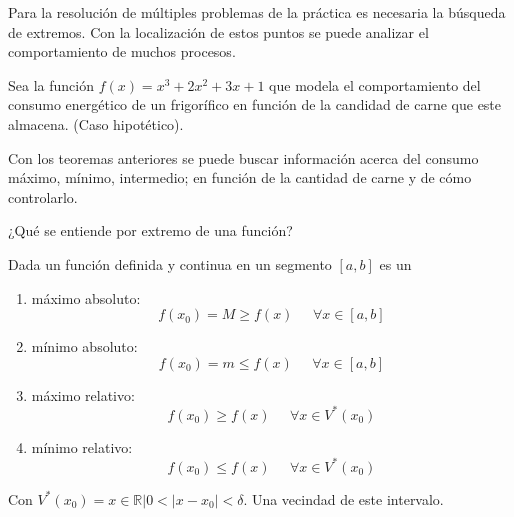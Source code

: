 \documentclass[10pt,twoside]{SelfArx} %
\begin{document}
   
   Para la resolución de múltiples problemas de la práctica es necesaria la búsqueda de extremos. Con la localización de estos puntos se puede analizar el comportamiento de muchos procesos.\\
\begin{ejemplo}
	Sea la función $ f(x)=x^{3}+2x^{2}+3x+1 $ que modela el comportamiento del consumo energético  de un frigorífico en función de la candidad de carne que este almacena. (Caso hipotético).
\end{ejemplo}	
   Con los teoremas anteriores se puede buscar información acerca del consumo máximo, mínimo, intermedio; en función de la cantidad de carne y de cómo controlarlo.
   \begin{center}
   	¿Qué se entiende por extremo de una función?
   \end{center}
   \begin{thm}
   	Dada un función definida y continua en un segmento $ [a,b] $ es un
   	\begin{enumerate}
   		\item  máximo absoluto:
   		\[ f(x_{0})=M\geq f(x) \;\;\;\;\; \forall x\in[a,b]\]
   		\item mínimo absoluto:
   		\[ f(x_{0})=m\leq f(x) \;\;\;\;\; \forall x\in[a,b]\]
   		\item máximo relativo:
   		\[ f(x_{0})\geq f(x) \;\;\;\;\; \forall x\in V^{*}(x_{0})\]
   		\item mínimo relativo:
   		\[ f(x_{0})\leq f(x) \;\;\;\;\; \forall x\in V^{*}(x_{0})\]
   	\end{enumerate}
   	Con $ V^{*}(x_{0})={x\in \mathbb{R}| 0<|x-x_{0}|<\delta} $. Una vecindad de este intervalo.
   \end{thm}
   
\end{document}
